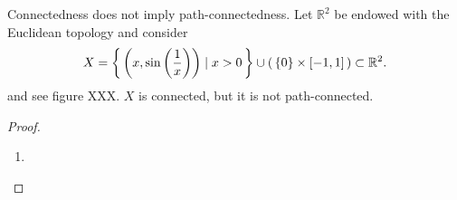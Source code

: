\begin{example}
    Connectedness does not imply path-connectedness. Let \(\mathbb{R}^2\) be endowed with the Euclidean topology and consider 
    \begin{equation*}
        X = \left\{\, \left(x, \sin\left(\frac{1}{x}\right)\right) \mid x > 0 \,\right\} \cup \left(\,\{0\} \times [-1, 1]\,\right) \subset \mathbb{R}^2 \text{.}
    \end{equation*}
    and see figure XXX. \(X\) is connected, but it is not path-connected.
\end{example}
\begin{proof}
    \begin{enumerate}
        \item 
    \end{enumerate}
\end{proof}